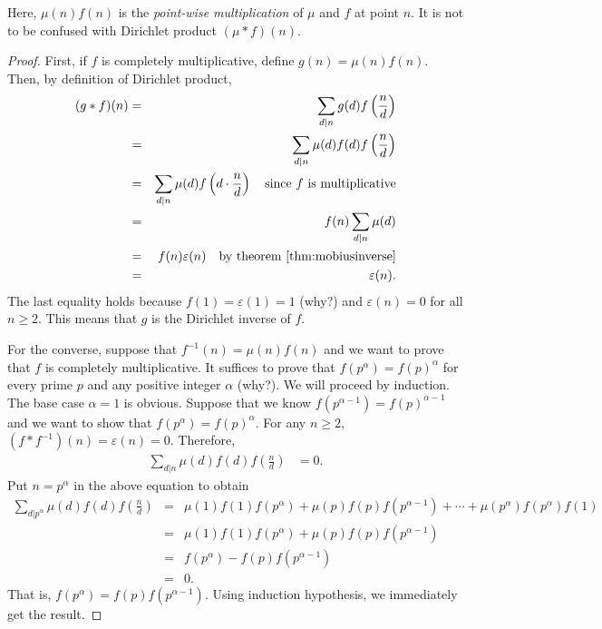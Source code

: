 \documentclass[12pt]{subfile}
\begin{document}
		\begin{note}
			Here, $\mu(n)f(n)$ is the \textit{point-wise multiplication} of $\mu$ and $f$ at point $n$. It is not to be confused with Dirichlet product $(\mu \ast f)(n)$.
		\end{note}
		
		\begin{proof}
			First, if $f$ is completely multiplicative, define $g(n) = \mu(n) f(n)$. Then, by definition of Dirichlet product,
				\begin{eqnarray*}
					(g \ast f)(n) &=& \sum_{d|n} g(d) f\left(\frac{n}{d}\right)\\
								  &=& \sum_{d|n} \mu(d) f(d) f\left(\frac{n}{d}\right)\\
								  &=& \sum_{d|n} \mu(d) f\left(d \cdot \frac{n}{d}\right) \quad \text{since } f \text{ is multiplicative}\\
								  &=& f(n) \sum_{d|n} \mu(d)\\
								  &=& f(n) \varepsilon(n) \quad \text{by theorem \eqref{thm:mobiusinverse}}\\
								  &=& \varepsilon(n).
				\end{eqnarray*}
			The last equality holds because $f(1)=\varepsilon(1)=1$ (why?) and $\varepsilon(n)=0$ for all $n \geq 2$. This means that $g$ is the Dirichlet inverse of $f$.
			
			For the converse, suppose that $f^{-1}(n) = \mu(n) f(n)$ and we want to prove that $f$ is completely multiplicative. It suffices to prove that $f(p^\alpha)=f(p)^\alpha$ for every prime $p$ and any positive integer $\alpha$ (why?). We will proceed by induction. The base case $\alpha =1$ is obvious. Suppose that we know $f(p^{\alpha-1})=f(p)^{\alpha-1}$ and we want to show that $f(p^\alpha)=f(p)^\alpha$. For any $n \geq 2$, $(f\ast f^{-1})(n)=\varepsilon(n)=0$. Therefore,
				\begin{align*}
					\sum_{d|n} \mu(d) f(d) f\left(\frac{n}{d}\right) &= 0.
				\end{align*}
			Put $n=p^\alpha$ in the above equation to obtain
				\begin{eqnarray*}
					\sum_{d|p^\alpha} \mu(d) f(d) f\left(\frac{n}{d}\right) 
						&=& \mu(1)f(1)f(p^\alpha) + \mu(p)f(p)f(p^{\alpha -1}) + \cdots +\mu(p^\alpha) f(p^\alpha)f(1)\\
						&=& \mu(1)f(1)f(p^\alpha) + \mu(p)f(p)f(p^{\alpha -1})\\
						&=& f(p^\alpha) - f(p) f(p^{\alpha -1}) \\
						&=& 0.
				\end{eqnarray*}
			That is, $f(p^\alpha) = f(p) f(p^{\alpha -1})$. Using induction hypothesis, we immediately get the result.
		\end{proof}
		
\end{document}
